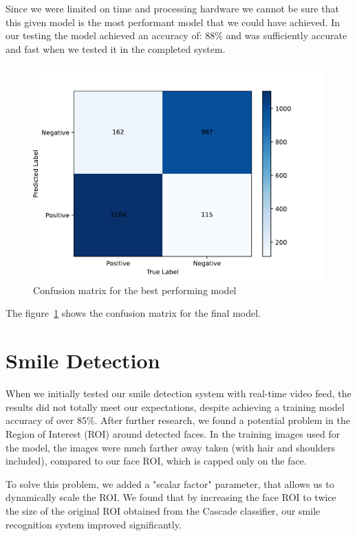 \documentclass[12pt,a4paper,english
]{tunithesis}
\begin{document}
Since we were limited on time and processing hardware we cannot be sure that this given model is the most performant model that we could have achieved. In our testing the model achieved an accuracy of: 88\% and was sufficiently accurate and fast when we tested it in the completed system.

\begin{figure}
  \centering
  \includegraphics[width=\columnwidth]{img/confusion_matrix_best.pdf}
  \caption{Confusion matrix for the best performing model}
  \label{fig:confusion_matrix_best}
\end{figure}

The figure~\ref{fig:confusion_matrix_best} shows the confusion matrix for the final model.

\section{Smile Detection}
When we initially tested our smile detection system with real-time video feed, the results did not totally meet our expectations, despite achieving a training model accuracy of over 85\%. After further research, we found a potential problem in the Region of Interest (ROI) around detected faces. In the training images used for the model, the images were much farther away taken (with hair and shoulders included), compared to our face ROI, which is capped only on the face.  

To solve this problem, we added a "scalar factor" parameter, that allows us to dynamically scale the ROI. We found that by increasing the face ROI to twice the size of the original ROI obtained from the Cascade classifier, our smile recognition system improved significantly.
\end{document}
